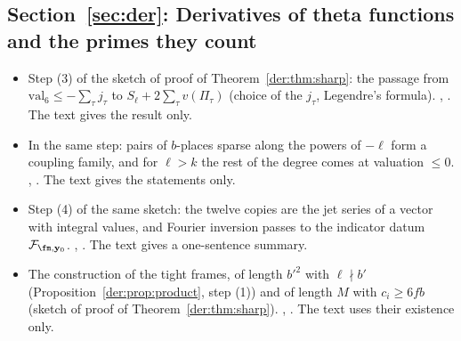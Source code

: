 \subsection*{Section~\ref{sec:der}: Derivatives of theta functions and the primes they count}
\begin{itemize}[leftmargin=2em,itemsep=1pt]
\item Step (3) of the sketch of proof of Theorem~\ref{der:thm:sharp}: the passage from
  $\mathrm{val}_6\le-\sum_\tau j_\tau$ to $S_\ell+2\sum_\tau v(\Pi_\tau)$ (choice of the $j_\tau$, Legendre's
  formula). ,
  . The text gives the result only.
\item In the same step: pairs of $b$-places sparse along the powers of $-\ell$ form a coupling family,
  and for $\ell>k$ the rest of the degree comes at valuation $\le0$.
  , . The text
  gives the statements only.
\item Step (4) of the same sketch: the twelve copies are the jet series of a vector with integral
  values, and Fourier inversion passes to the indicator datum $\mathcal F_{\fm,\mathbf y_0}$.
  ,
  . The text gives a one-sentence summary.
\item The construction of the tight frames, of length $b'^2$ with $\ell\nmid b'$
  (Proposition~\ref{der:prop:product}, step (1)) and of length $M$ with $c_i\ge6fb$ (sketch of proof of
  Theorem~\ref{der:thm:sharp}). ,
  . The text uses their existence only.
\end{itemize}

